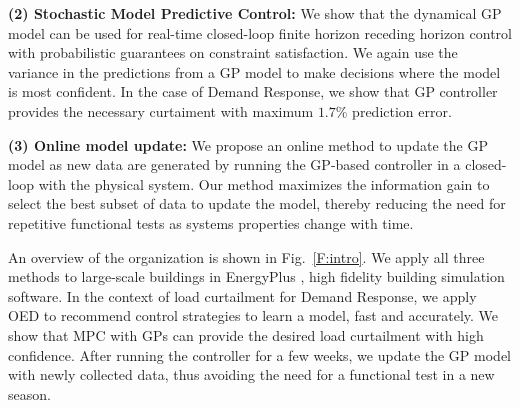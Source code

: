 \noindent \textbf{(2) Stochastic Model Predictive Control:} We show that the dynamical GP model can be used for real-time closed-loop finite horizon receding horizon control with probabilistic guarantees on constraint satisfaction. We again use the variance in the predictions from a GP model to make decisions where the model is most confident. In the case of Demand Response, we show that GP controller provides the necessary curtaiment with maximum \(1.7\% \) prediction error.
	
\noindent \textbf{(3) Online model update:} We propose an online method to update the GP model as new data are generated by running the GP-based controller in a closed-loop with the physical system.
Our method maximizes the information gain to select the best subset of data to update the model, thereby reducing the need for repetitive functional tests as systems properties change with time.

An overview of the organization is shown in Fig.~\ref{F:intro}.
We apply all three methods to large-scale buildings in EnergyPlus \cite{Deru2011}, high fidelity building simulation software.
In the context of load curtailment for Demand Response, we apply OED to recommend control strategies to learn a model, fast and accurately. We show that MPC with GPs can provide the desired load curtailment with high confidence. After running the controller for a few weeks, we update the GP model with newly collected data, thus avoiding the need for a functional test in a new season.



